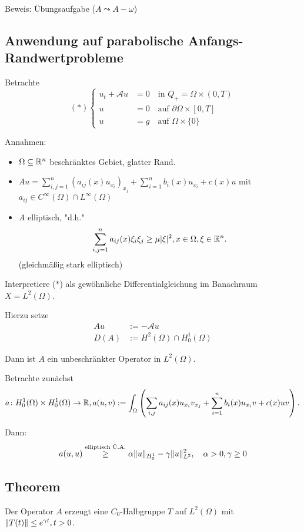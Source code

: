 Beweis: Übungsaufgabe ($A \leadsto A - \omega$)

\subsection{Anwendung auf parabolische Anfangs-Randwertprobleme}

Betrachte 
$$
(\ast)
\begin{cases}
u_t + \mathcal{A} u &= 0 \quad\text{in } Q_+ = \Omega \times (0,T) \\
u &= 0 \quad\text{auf } \partial\Omega \times [0,T]\\
u &= g \quad\text{auf } \Omega \times \{0\}
\end{cases}
$$

Annahmen: 
\begin{itemize}
  \item $\Omega \subseteq \mathbb{R}^n$ beschränktes Gebiet, glatter Rand.
  \item $A u = \sum_{i,j = 1}^n (a_{ij}(x) u_{x_i})_{x_j} + \sum_{i = 1}^n b_i(x) u_{x_i} + c(x) u$ mit $a_{ij} \in C^\infty(\Omega) \cap L^\infty(\Omega)$
  \item $A$ elliptisch, "d.h."
  $$
  \sum_{i, j = 1}^n a_{ij}(x) \xi_i \xi_j \geq \mu|\xi|^2, x \in \Omega, \xi \in \mathbb{R}^n.
  $$ 
  (gleichmäßig stark elliptisch)
\end{itemize}

Interpretiere ($\ast$) als gewöhnliche Differentialgleichung im Banachraum $X = L^2(\Omega)$.

Hierzu setze
\begin{align*}
  A u &:= -\mathcal{A} u \\
  D(A) &:= H^2(\Omega) \cap H_0^1(\Omega)
\end{align*}

Dann ist $A$ ein unbeschränkter Operator in $L^2(\Omega)$.

Betrachte zunächst
$$
  a \colon H_0^1(\Omega) \times H_0^1(\Omega) \to \mathbb{R}, 
  a(u,v) := \int_\Omega \left( \sum_{i,j} a_{ij}(x) u_{x_i} v_{x_j} + \sum_{i = 1}^n b_i(x) u_{x_i} v + c(x) uv \right).
$$

Dann: 
$$
  a(u,u) \overset{\text{elliptisch Ü.A.}}{\geq} \alpha \lVert u \rVert_{H_0^1} - \gamma \lVert u \rVert_{L^2}^2, \quad \alpha > 0, \gamma \geq 0
$$

\subsection{Theorem}

Der Operator $A$ erzeugt eine $C_0$-Halbgruppe $T$ auf $L^2(\Omega)$ mit $\lVert T(t) \rVert \leq e^{\gamma t}, t > 0$.


